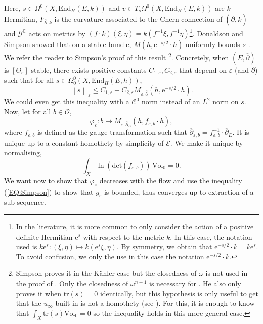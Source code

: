 \documentclass{article}
\theoremstyle{remark}
\theoremstyle{definition}
\newcommand{\C}{\mathbb{C}}
\newcommand{\End}{\mathrm{End}}
\newcommand{\tr}{\mathrm{tr}}
\renewcommand{\det}{\mathrm{det}}
\newcommand{\Vol}{\mathrm{Vol}}
\newcommand{\e}{\boldsymbol{\mathrm{e}}}
\newcommand{\norme}[1]{\left\| #1 \right\|}
\newcommand{\E}{\mathcal{E}}
\newcommand{\G}{\mathcal{G}}
\newcommand{\dbar}{\overline{\partial}}
\newcommand{\mC}{\mathcal{C}}
\renewcommand{\leq}{\leqslant}
\begin{document}
Here, $s \in \Omega^0(X,\End_H(E,k))$ and $v \in T_s\Omega^0(X,\End_H(E,k))$ are $k$-Hermitian, $F_{\dbar,k}$ is the curvature associated to the Chern connection of $(\dbar,k)$ and $\G^\C$ acts on metrics by $(f \cdot k)(\xi,\eta) = k(f^{-1}\xi,f^{-1}\eta)$\footnote{In the literature, it is more common to only consider the action of a positive definite Hermitian $\e^s$ with respect to the metric $k$. In this case, the notation used is $k\e^s : (\xi,\eta) \mapsto k(\e^s\xi,\eta)$. By symmetry, we obtain that $\e^{-s/2} \cdot k = k\e^s$. To avoid confusion, we only the use in this case the notation $\e^{-s/2} \cdot k$.}. Donaldson and Simpson showed that on a stable bundle, $M(h,\e^{-s/2} \cdot h)$ uniformly bounds $s$ \cite{Donaldson,Simpson}. We refer the reader to Simpson's proof of this result \cite[Proposition 5.3]{Simpson}\footnote{Simpson proves it in the Kähler case but the closedness of $\omega$ is not used in the proof of \cite[Proposition 5.3]{Simpson}. Only the closedness of $\omega^{n - 1}$ is necessary for \cite[Proposition 5.1]{Simpson}. He also only proves it when $\tr(s) = 0$ identically, but this hypothesis is only useful to get that the $u_\infty$ built in \cite[Lemma 5.4]{Simpson} is not a homothety (see \cite[Lemma 5.5]{Simpson}). For this, it is enough to know that $\int_X \tr(s)\Vol_0 = 0$ so the inequality holds in this more general case.}. Concretely, when $(E,\dbar)$ is $[\Theta_\varepsilon]$-stable, there exists positive constants $C_{1,\varepsilon},C_{2,\varepsilon}$ that depend on $\varepsilon$ (and $\dbar$) such that for all $s \in \Omega_0^0(X,\End_H(E,h))$,
\begin{equation}\label{EQ:Simpson}
    \norme{s}_\varepsilon \leq C_{1,\varepsilon} + C_{2,\varepsilon}M_{\varepsilon,\dbar}(h,\e^{-s/2} \cdot h).
\end{equation}
We could even get this inequality with a $\mC^0$ norm instead of an $L^2$ norm on $s$. Now, let for all $b \in \mathcal{O}$,
$$
\varphi_\varepsilon : b \mapsto M_{\varepsilon,\dbar_E}(h,f_{\varepsilon,b} \cdot h),
$$
where $f_{\varepsilon,b}$ is defined as the gauge transformation such that $\dbar_{\varepsilon,b} = f_{\varepsilon,b}^{-1} \cdot \dbar_E$. It is unique up to a constant homothety by simplicity of $\E$. We make it unique by normalising,
$$
\int_X \ln(\det(f_{\varepsilon,b})) \, \Vol_0 = 0.
$$
We want now to show that $\varphi_\varepsilon$ decreases with the flow and use the inequality (\ref{EQ:Simpson}) to show that $g_\varepsilon$ is bounded, thus converges up to extraction of a sub-sequence.
\end{document}

